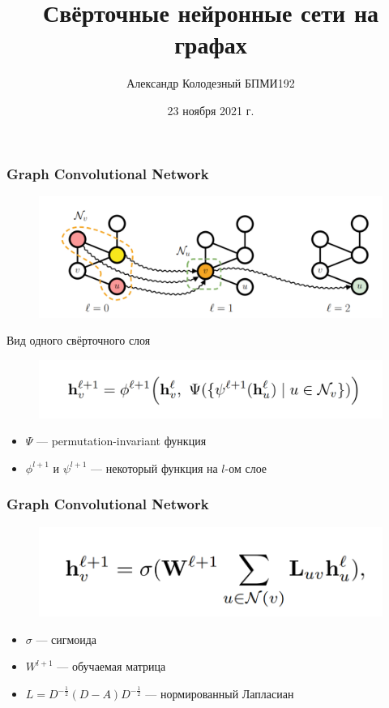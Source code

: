 \documentclass{beamer}
\title[Заголовок]{Свёрточные нейронные сети на графах}
\author[Александр Колодезный]{Александр Колодезный БПМИ192}
\institute[Высшая школа экономики]{Национальный исследовательский университет \\ «Высшая школа экономики» (Москва)}
\date{23 ноября 2021 г.}
\begin{document}

\frame[plain]{\titlepage}	%

\begin{frame}
\frametitle{Graph Convolutional Network}
\begin{figure}
	\includegraphics[width=0.7\columnwidth]{message_propagation.png}
\end{figure}
Вид одного свёрточного слоя
\begin{figure}
	\includegraphics[width=0.8\columnwidth]{fromula1.png}
\end{figure}
\begin{itemize}
	\item $\Psi$ --- permutation-invariant функция
	\item $\phi^{l + 1}$ и $\psi^{l + 1}$ --- некоторый функция на $l$-ом слое
\end{itemize}
\end{frame}

\begin{frame}
\frametitle{Graph Convolutional Network}
\begin{figure}
	\includegraphics[width=0.8\columnwidth]{formula2.png}
\end{figure}
\begin{itemize}
	\item $\sigma$ --- сигмоида
	\item $W^{l + 1}$ --- обучаемая матрица
	\item $L = D^{-\frac{1}{2}}(D - A)D^{-\frac{1}{2}}$ --- нормированный Лапласиан
\end{itemize}
\end{frame}
\end{document}
